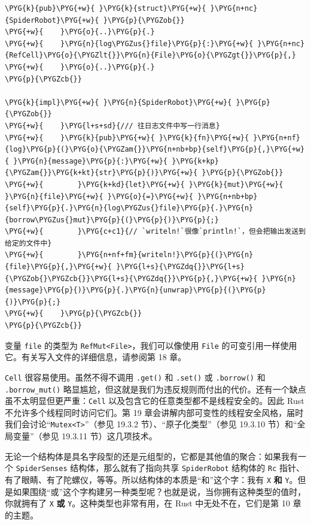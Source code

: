 \begin{Verbatim}[commandchars=\\\{\},breaklines=true,breakanywhere=true,fontsize=\codefont,xleftmargin=17bp]
\PYG{k}{pub}\PYG{+w}{ }\PYG{k}{struct}\PYG{+w}{ }\PYG{n+nc}{SpiderRobot}\PYG{+w}{ }\PYG{p}{\PYGZob{}}
\PYG{+w}{    }\PYG{o}{..}\PYG{p}{.}
\PYG{+w}{    }\PYG{n}{log\PYGZus{}file}\PYG{p}{:}\PYG{+w}{ }\PYG{n+nc}{RefCell}\PYG{o}{\PYGZlt{}}\PYG{n}{File}\PYG{o}{\PYGZgt{}}\PYG{p}{,}
\PYG{+w}{    }\PYG{o}{..}\PYG{p}{.}
\PYG{p}{\PYGZcb{}}

\PYG{k}{impl}\PYG{+w}{ }\PYG{n}{SpiderRobot}\PYG{+w}{ }\PYG{p}{\PYGZob{}}
\PYG{+w}{    }\PYG{l+s+sd}{/// 往日志文件中写一行消息}
\PYG{+w}{    }\PYG{k}{pub}\PYG{+w}{ }\PYG{k}{fn}\PYG{+w}{ }\PYG{n+nf}{log}\PYG{p}{(}\PYG{o}{\PYGZam{}}\PYG{n+nb+bp}{self}\PYG{p}{,}\PYG{+w}{ }\PYG{n}{message}\PYG{p}{:}\PYG{+w}{ }\PYG{k+kp}{\PYGZam{}}\PYG{k+kt}{str}\PYG{p}{)}\PYG{+w}{ }\PYG{p}{\PYGZob{}}
\PYG{+w}{        }\PYG{k+kd}{let}\PYG{+w}{ }\PYG{k}{mut}\PYG{+w}{ }\PYG{n}{file}\PYG{+w}{ }\PYG{o}{=}\PYG{+w}{ }\PYG{n+nb+bp}{self}\PYG{p}{.}\PYG{n}{log\PYGZus{}file}\PYG{p}{.}\PYG{n}{borrow\PYGZus{}mut}\PYG{p}{(}\PYG{p}{)}\PYG{p}{;}
\PYG{+w}{        }\PYG{c+c1}{// `writeln!`很像`println!`，但会把输出发送到给定的文件中}
\PYG{+w}{        }\PYG{n+nf+fm}{writeln!}\PYG{p}{(}\PYG{n}{file}\PYG{p}{,}\PYG{+w}{ }\PYG{l+s}{\PYGZdq{}}\PYG{l+s}{\PYGZob{}\PYGZcb{}}\PYG{l+s}{\PYGZdq{}}\PYG{p}{,}\PYG{+w}{ }\PYG{n}{message}\PYG{p}{)}\PYG{p}{.}\PYG{n}{unwrap}\PYG{p}{(}\PYG{p}{)}\PYG{p}{;}
\PYG{+w}{    }\PYG{p}{\PYGZcb{}}
\PYG{p}{\PYGZcb{}}
\end{Verbatim}

变量 \texttt{file} 的类型为 \texttt{RefMut<File>}，我们可以像使用 \texttt{File} 的可变引用一样使用它。有关写入文件的详细信息，请参阅第 18 章。

\texttt{Cell} 很容易使用。虽然不得不调用 \texttt{.get()} 和 \texttt{.set()} 或 \texttt{.borrow()} 和 \texttt{.borrow\_mut()} 略显尴尬，但这就是我们为违反规则而付出的代价。还有一个缺点虽不太明显但更严重：\texttt{Cell} 以及包含它的任意类型都不是线程安全的。因此 Rust 不允许多个线程同时访问它们。第 19 章会讲解内部可变性的线程安全风格，届时我们会讨论“\texttt{Mutex<T>}”（参见 19.3.2 节）、“原子化类型”（参见 19.3.10 节）和“全局变量”（参见 19.3.11 节）这几项技术。

无论一个结构体是具名字段型的还是元组型的，它都是其他值的聚合：如果我有一个 \texttt{SpiderSenses} 结构体，那么就有了指向共享 \texttt{SpiderRobot} 结构体的 \texttt{Rc} 指针、有了眼睛、有了陀螺仪，等等。所以结构体的本质是“和”这个字：我有 \texttt{X} \textbf{和} \texttt{Y}。但是如果围绕“或”这个字构建另一种类型呢？也就是说，当你拥有这种类型的值时，你就拥有了 \texttt{X} \textbf{或} \texttt{Y}。这种类型也非常有用，在 Rust 中无处不在，它们是第 10 章的主题。

